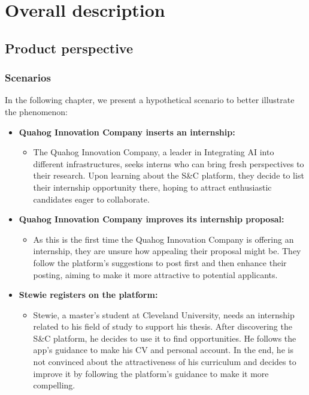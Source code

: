 \chapter{Overall description}

\section{Product perspective}

\subsection{Scenarios}

In the following chapter, we present a hypothetical scenario to better illustrate the phenomenon:

\begin{itemize}[leftmargin=*, label={}]
    \item \textbf{Quahog Innovation Company inserts an internship:}
    \begin{itemize}
        \item The Quahog Innovation Company, a leader in Integrating AI into different infrastructures, seeks interns who can bring fresh perspectives to their research. Upon learning about the S\&C platform, they decide to list their internship opportunity there, hoping to attract enthusiastic candidates eager to collaborate. 
    \end{itemize}

    \item \textbf{Quahog Innovation Company improves its internship proposal:}
    \begin{itemize}
        \item As this is the first time the Quahog  Innovation Company is offering an internship, they are unsure how appealing their proposal might be. They follow the platform's suggestions to post first and then enhance their posting, aiming to make it more attractive to potential applicants.
    \end{itemize}

    \item \textbf{Stewie registers on the platform:}
    \begin{itemize}
        \item Stewie, a master’s student at Cleveland University, needs an internship related to his field of study to support his thesis. After discovering the S\&C platform, he decides to use it to find opportunities. He follows the app’s guidance to make his CV and personal account. In the end, he is not convinced about the attractiveness of his curriculum and decides to improve it by following the platform’s guidance to make it more compelling.
    \end{itemize}


\end{itemize}
